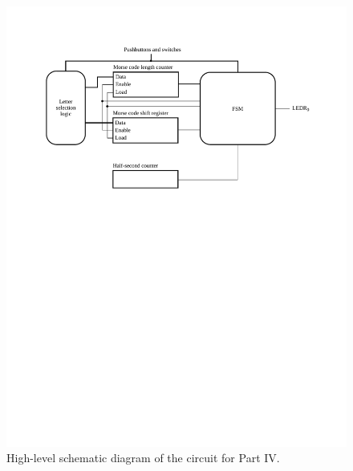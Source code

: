 \documentclass[epsfig,10pt,fullpage]{article}
\newcommand{\CommonDocsPath}{../../../common/docs}
\begin{document}
\begin{figure} [H]
\begin{center}
	\includegraphics[scale = 0.9]{figures/fig_morse_code_circuit_schematic.pdf}
\end{center}
\caption{High-level schematic diagram of the circuit for Part IV.}
\label{fig:morse_code_cct}
\end{figure}


\end{document}
